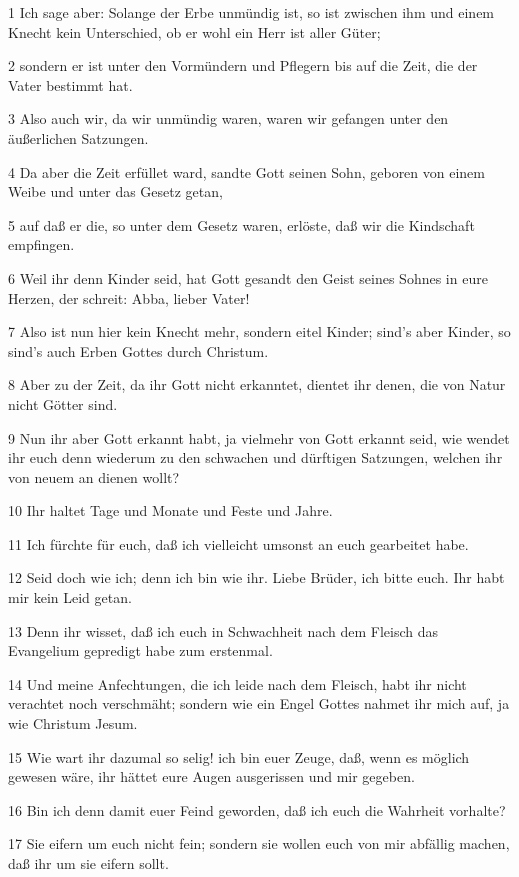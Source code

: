 \par 1 Ich sage aber: Solange der Erbe unmündig ist, so ist zwischen ihm und einem Knecht kein Unterschied, ob er wohl ein Herr ist aller Güter;
\par 2 sondern er ist unter den Vormündern und Pflegern bis auf die Zeit, die der Vater bestimmt hat.
\par 3 Also auch wir, da wir unmündig waren, waren wir gefangen unter den äußerlichen Satzungen.
\par 4 Da aber die Zeit erfüllet ward, sandte Gott seinen Sohn, geboren von einem Weibe und unter das Gesetz getan,
\par 5 auf daß er die, so unter dem Gesetz waren, erlöste, daß wir die Kindschaft empfingen.
\par 6 Weil ihr denn Kinder seid, hat Gott gesandt den Geist seines Sohnes in eure Herzen, der schreit: Abba, lieber Vater!
\par 7 Also ist nun hier kein Knecht mehr, sondern eitel Kinder; sind's aber Kinder, so sind's auch Erben Gottes durch Christum.
\par 8 Aber zu der Zeit, da ihr Gott nicht erkanntet, dientet ihr denen, die von Natur nicht Götter sind.
\par 9 Nun ihr aber Gott erkannt habt, ja vielmehr von Gott erkannt seid, wie wendet ihr euch denn wiederum zu den schwachen und dürftigen Satzungen, welchen ihr von neuem an dienen wollt?
\par 10 Ihr haltet Tage und Monate und Feste und Jahre.
\par 11 Ich fürchte für euch, daß ich vielleicht umsonst an euch gearbeitet habe.
\par 12 Seid doch wie ich; denn ich bin wie ihr. Liebe Brüder, ich bitte euch. Ihr habt mir kein Leid getan.
\par 13 Denn ihr wisset, daß ich euch in Schwachheit nach dem Fleisch das Evangelium gepredigt habe zum erstenmal.
\par 14 Und meine Anfechtungen, die ich leide nach dem Fleisch, habt ihr nicht verachtet noch verschmäht; sondern wie ein Engel Gottes nahmet ihr mich auf, ja wie Christum Jesum.
\par 15 Wie wart ihr dazumal so selig! ich bin euer Zeuge, daß, wenn es möglich gewesen wäre, ihr hättet eure Augen ausgerissen und mir gegeben.
\par 16 Bin ich denn damit euer Feind geworden, daß ich euch die Wahrheit vorhalte?
\par 17 Sie eifern um euch nicht fein; sondern sie wollen euch von mir abfällig machen, daß ihr um sie eifern sollt.
